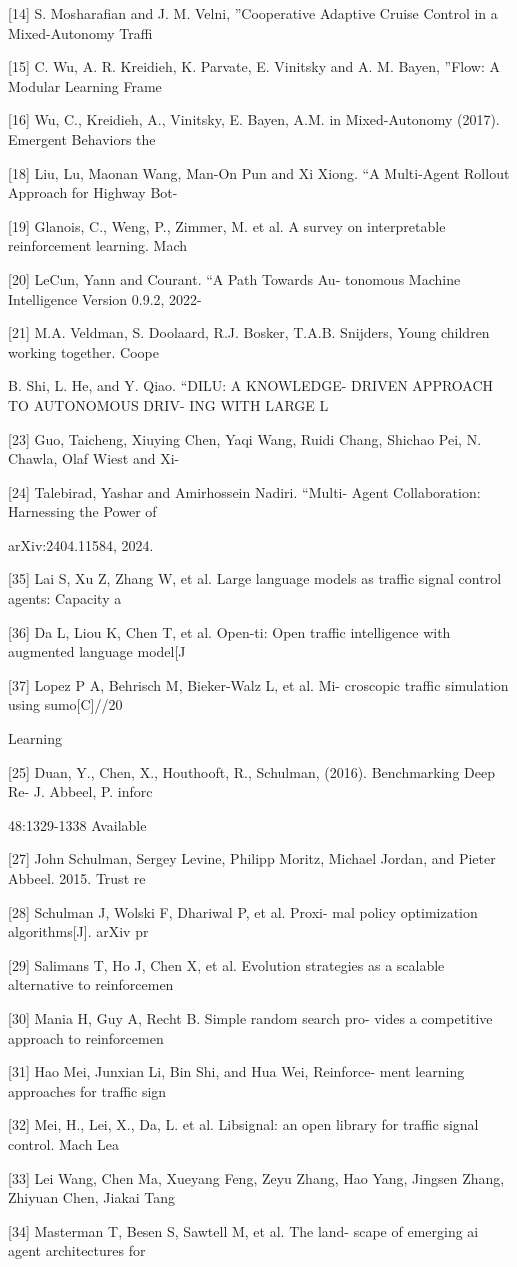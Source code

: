 \documentclass[12pt]{article}
\begin{document}
[14] S. Mosharafian and J. M. Velni, ”Cooperative Adaptive
Cruise Control in a Mixed-Autonomy Traffi


[15] C. Wu, A. R. Kreidieh, K. Parvate, E. Vinitsky and
A. M. Bayen, ”Flow: A Modular Learning Frame


[16] Wu, C., Kreidieh, A., Vinitsky, E. Bayen, A.M.
in Mixed-Autonomy
(2017). Emergent Behaviors
the


[18] Liu, Lu, Maonan Wang, Man-On Pun and Xi Xiong.
“A Multi-Agent Rollout Approach for Highway Bot-


[19] Glanois, C., Weng, P., Zimmer, M. et al. A survey on
interpretable reinforcement learning. Mach


[20] LeCun, Yann and Courant. “A Path Towards Au-
tonomous Machine Intelligence Version 0.9.2, 2022-


[21] M.A. Veldman, S. Doolaard, R.J. Bosker, T.A.B.
Snijders, Young children working together. Coope


B. Shi, L. He, and Y. Qiao. “DILU: A KNOWLEDGE-
DRIVEN APPROACH TO AUTONOMOUS DRIV-
ING WITH LARGE L


[23] Guo, Taicheng, Xiuying Chen, Yaqi Wang, Ruidi
Chang, Shichao Pei, N. Chawla, Olaf Wiest and Xi-


[24] Talebirad, Yashar and Amirhossein Nadiri. “Multi-
Agent Collaboration: Harnessing the Power of 


arXiv:2404.11584, 2024.


[35] Lai S, Xu Z, Zhang W, et al. Large language models
as traffic signal control agents: Capacity a


[36] Da L, Liou K, Chen T, et al. Open-ti: Open traffic
intelligence with augmented language model[J


[37] Lopez P A, Behrisch M, Bieker-Walz L, et al. Mi-
croscopic traffic simulation using sumo[C]//20


Learning


[25] Duan, Y., Chen, X., Houthooft, R., Schulman,
(2016). Benchmarking Deep Re-
J. Abbeel, P.
inforc


48:1329-1338 Available


[27] John Schulman, Sergey Levine, Philipp Moritz,
Michael Jordan, and Pieter Abbeel. 2015. Trust re


[28] Schulman J, Wolski F, Dhariwal P, et al. Proxi-
mal policy optimization algorithms[J]. arXiv pr


[29] Salimans T, Ho J, Chen X, et al. Evolution strategies
as a scalable alternative to reinforcemen


[30] Mania H, Guy A, Recht B. Simple random search pro-
vides a competitive approach to reinforcemen


[31] Hao Mei, Junxian Li, Bin Shi, and Hua Wei, Reinforce-
ment learning approaches for traffic sign


[32] Mei, H., Lei, X., Da, L. et al. Libsignal: an open library
for traffic signal control. Mach Lea


[33] Lei Wang, Chen Ma, Xueyang Feng, Zeyu Zhang,
Hao Yang, Jingsen Zhang, Zhiyuan Chen, Jiakai Tang


[34] Masterman T, Besen S, Sawtell M, et al. The land-
scape of emerging ai agent architectures for 
\end{document}
